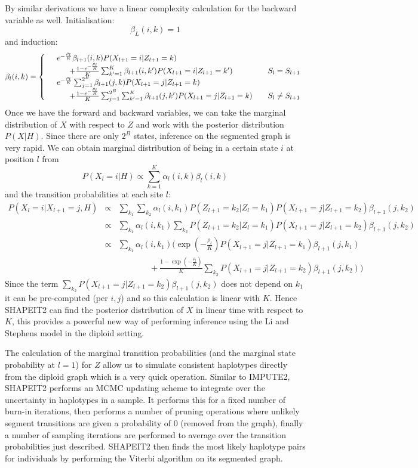 By similar derivations we have a linear complexity calculation for the backward variable as well. Initialisation:
$$\beta_L(i,k)=1$$
and induction:
  \[ \beta_l(i,k) = \left\{ 
  \begin{array}{l ll}
   & e^{-\frac{\rho_l}{K}}\beta_{l+1}(i,k) P(X_{l+1}=i|Z_{l+1}=k)& \\ &~~~~~+ \frac{1-e^{-\frac{\rho_l}{K}}}{K} \sum_{k'=1}^K \beta_{l+1}(i,k')P(X_{l+1}=i|Z_{l+1}=k')   & \quad S_l=S_{l+1}\\
    &e^{-\frac{\rho_l}{K}} \sum_{j=1}^{2^B} \beta_{l+1}(j,k) P(X_{l+1}=j|Z_{l+1}=k)& \\ &~~~~~+ \frac{1-e^{-\frac{\rho_l}{K}}}{K} \sum_{j=1}^{2^B} \sum_{k'=1}^K \beta_{l+1}(j,k')P(X_{l+1}=j|Z_{l+1}=k)  & \quad S_l \neq S_{l+1} \\
  \end{array}  
  \right.\]
Once we have the forward and backward variables, we can take the marginal distribution of $X$ with respect to $Z$ and work with the posterior distribution $P(X|H)$. Since there are only $2^B$ states, inference on the segmented graph is very rapid.  We can obtain marginal distribution of being in a certain state $i$ at position $l$ from
$$P(X_l=i|H) \propto \sum^K_{k=1}\alpha_l(i,k)\beta_l(i,k)$$
and the transition probabilities at each site $l$:
\small
\begin{eqnarray*}
  P(X_l=i|X_{l+1}=j,H)& \propto& \sum_{k_1}\sum_{k_2} \alpha_l(i,k_1)P(Z_{l+1}=k_2|Z_l=k_1)P(X_{l+1}=j|Z_{l+1}=k_2)\beta_{l+1}(j,k_2)\\
  & \propto& \sum_{k_1}  \alpha_l(i,k_1) \sum_{k_2}P(Z_{l+1}=k_2|Z_l=k_1)P(X_{l+1}=j|Z_{l+1}=k_2)\beta_{l+1}(j,k_2)\\
  & \propto& \sum_{k_1} \alpha_l(i,k_1) \Bigg( \exp(-\frac{\rho_l}{K})P(X_{l+1}=j|Z_{l+1}=k_1)\beta_{l+1}(j,k_1)\\
  &&~~~~~~~~~~~~~~~~~ + \frac{1-\exp(-\frac{\rho_l}{K})}{K} \sum_{k_2}P(X_{l+1}=j|Z_{l+1}=k_2)\beta_{l+1}(j,k_2) \Bigg)
\end{eqnarray*}
\normalsize
Since the term $\sum_{k_2}P(X_{l+1}=j|Z_{l+1}=k_2)\beta_{l+1}(j,k_2)$ does not depend on $k_1$ it can be pre-computed (per $i,j$) and so this calculation is linear with $K$.  Hence SHAPEIT2 can find the posterior distribution of $X$ in linear time with respect to $K$, this provides a powerful new way of performing inference using the Li and Stephens model in the diploid setting.  

The calculation of the marginal transition probabilities (and the marginal state probability at $l=1$) for $Z$ allow us to simulate consistent haplotypes directly from the diploid graph which is a very quick operation. Similar to IMPUTE2, SHAPEIT2 performs an MCMC updating scheme to integrate over the uncertainty in haplotypes in a sample. It performs this for a fixed number of burn-in iterations, then performs a number of pruning operations where unlikely segment transitions are given a probability of 0 (removed from the graph), finally a number of sampling iterations are performed to average over the transition probabilities just described.  SHAPEIT2 then finds the most likely haplotype pairs for individuals by performing the Viterbi algorithm on its segmented graph. 

